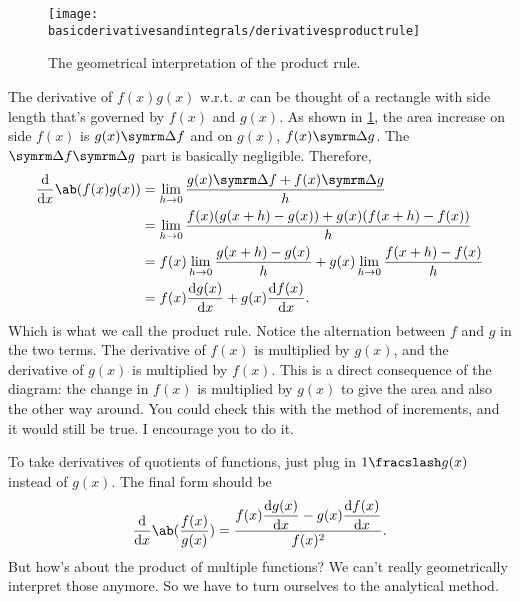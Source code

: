 \begin{figure}[h]
    \centering
    \texttt{[image: basicderivativesandintegrals/derivativesproductrule]}
    \caption{The geometrical interpretation of the product rule.}
    \label{fig:derivativesproductrule}
\end{figure}
The derivative of $f(x)g(x)$ w.r.t. $x$ can be thought of a rectangle with side length that's governed by $f(x)$ and $g(x)$. As shown in \cref{fig:derivativesproductrule}, the area increase on side $f(x)$ is $g(x)\Dd{f}$ and on $g(x)$, $f(x)\Dd{g}$. The $\Dd{f}\Dd{g}$ part is basically negligible. Therefore,
\begin{align*}
    \odv*{\ab(f(x)g(x))}{x} &= \lim_{h \appr 0}\frac{g(x)\Dd{f} + f(x)\Dd{g}}{h} \\
    &= \lim_{h \appr 0}\frac{f(x)(g(x + h) - g(x)) + g(x)(f(x + h) - f(x))}{h} \\
    &= f(x)\lim_{h \appr 0}\frac{g(x + h) - g(x)}{h} + g(x)\lim_{h \appr 0}\frac{f(x + h) - f(x)}{h} \\
    &= f(x)\odv{g(x)}{x} + g(x)\odv{f(x)}{x}.
\end{align*}
Which is what we call the product rule. Notice the alternation between $f$ and $g$ in the two terms. The derivative of $f(x)$ is multiplied by $g(x)$, and the derivative of $g(x)$ is multiplied by $f(x)$. This is a direct consequence of the diagram: the change in $f(x)$ is multiplied by $g(x)$ to give the area and also the other way around. You could check this with the method of increments, and it would still be true. I encourage you to do it.

To take derivatives of quotients of functions, just plug in $\flatfrac{1}{g(x)}$ instead of $g(x)$. The final form should be
\begin{equation}
    \odv*{\ab(\frac{f(x)}{g(x)})}{x} = \frac{\displaystyle f(x)\odv{g(x)}{x} - g(x)\odv{f(x)}{x}}{f(x)^2}.
\end{equation}
But how's about the product of multiple functions? We can't really geometrically interpret those anymore. So we have to turn ourselves to the analytical method.

